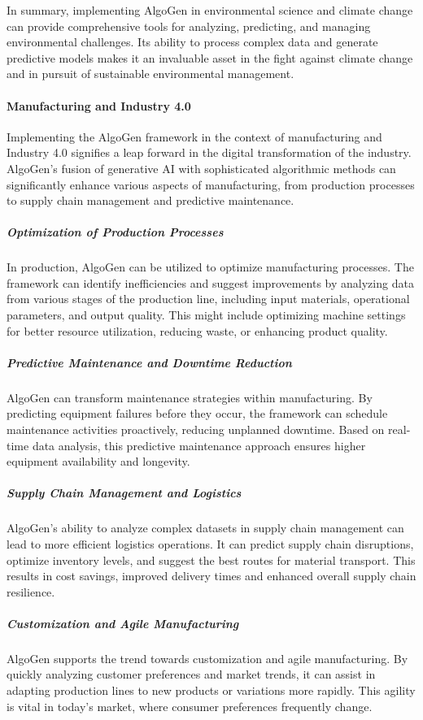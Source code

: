 \documentclass{article}
\begin{document}
In summary, implementing AlgoGen in environmental science and climate change can provide comprehensive tools for analyzing, predicting, and managing environmental challenges. Its ability to process complex data and generate predictive models makes it an invaluable asset in the fight against climate change and in pursuit of sustainable environmental management.



\paragraph{Manufacturing and Industry 4.0}
Implementing the AlgoGen framework in the context of manufacturing and Industry 4.0 signifies a leap forward in the digital transformation of the industry. AlgoGen's fusion of generative AI with sophisticated algorithmic methods can significantly enhance various aspects of manufacturing, from production processes to supply chain management and predictive maintenance.

\subparagraph{Optimization of Production Processes}
In production, AlgoGen can be utilized to optimize manufacturing processes. The framework can identify inefficiencies and suggest improvements by analyzing data from various stages of the production line, including input materials, operational parameters, and output quality. This might include optimizing machine settings for better resource utilization, reducing waste, or enhancing product quality.

\subparagraph{Predictive Maintenance and Downtime Reduction}
AlgoGen can transform maintenance strategies within manufacturing. By predicting equipment failures before they occur, the framework can schedule maintenance activities proactively, reducing unplanned downtime. Based on real-time data analysis, this predictive maintenance approach ensures higher equipment availability and longevity.

\subparagraph{Supply Chain Management and Logistics}
AlgoGen's ability to analyze complex datasets in supply chain management can lead to more efficient logistics operations. It can predict supply chain disruptions, optimize inventory levels, and suggest the best routes for material transport. This results in cost savings, improved delivery times and enhanced overall supply chain resilience.

\subparagraph{Customization and Agile Manufacturing}
AlgoGen supports the trend towards customization and agile manufacturing. By quickly analyzing customer preferences and market trends, it can assist in adapting production lines to new products or variations more rapidly. This agility is vital in today’s market, where consumer preferences frequently change.
\end{document}
